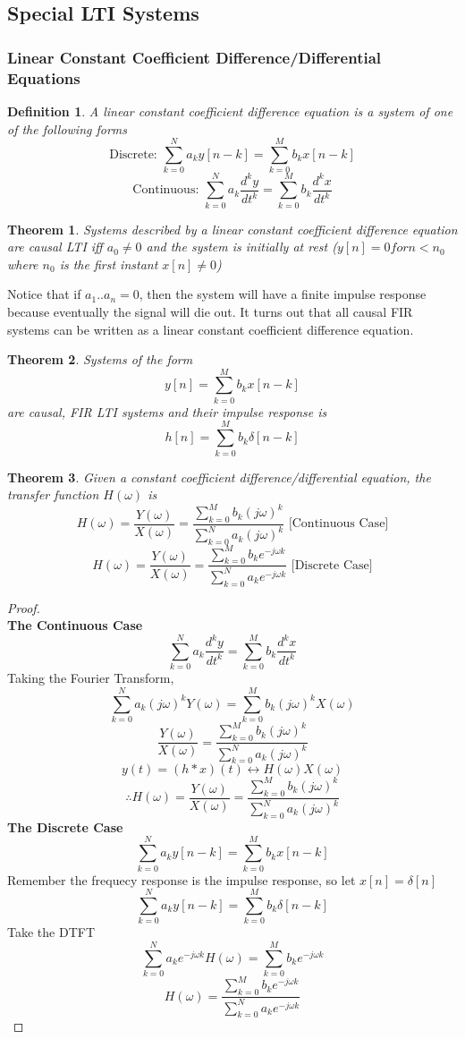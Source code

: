 \documentclass{article}
\newtheorem{theorem}{Theorem}
\newtheorem{definition}{Definition}
\newtheorem{proof}{Proof}
\begin{document}
\subsection{Special LTI Systems}
\subsubsection{Linear Constant Coefficient Difference/Differential Equations}
\begin{definition}
    A linear constant coefficient difference equation is a system of one of the following forms
    $$\text{Discrete: } \sum_{k=0}^{N}{a_k y[n-k]} = \sum_{k=0}^{M}{b_k x[n-k]}$$
    $$\text{Continuous: } \sum_{k=0}^{N}{a_k\frac{d^ky}{dt^k}} = \sum_{k=0}^{M}{b_k\frac{d^kx}{dt^k}}$$
\end{definition}
\begin{theorem}
    Systems described by a linear constant coefficient difference equation are causal LTI iff $a_0 \ne 0$
    and the system is initially at rest ($y[n] = 0 for n < n_0$ where $n_0$ is the first instant $x[n] \ne 0$)
\end{theorem}
Notice that if $a_1..a_n = 0$, then the system will have a finite impulse response because eventually the signal will die out.
It turns out that all causal FIR systems can be written as a linear constant coefficient difference equation.
\begin{theorem}
    Systems of the form
    $$y[n] = \sum_{k=0}^{M}{b_k x[n-k]}$$ are causal, FIR LTI systems and their impulse response is
    $$h[n] = \sum_{k=0}^{M}{b_k \delta[n-k]}$$
\end{theorem}
\begin{theorem}
    Given a constant coefficient difference/differential equation, the transfer function $H(\omega)$ is
    $$H(\omega) = \frac{Y(\omega)}{X(\omega)} = \frac{\sum_{k=0}^{M}{b_k(j\omega)^k}}{\sum_{k=0}^{N}{a_k(j\omega)^k}}\text{ [Continuous Case]}$$
    $$H(\omega) = \frac{Y(\omega)}{X(\omega)} = \frac{\sum_{k=0}^{M}{b_ke^{-j\omega k}}}{\sum_{k=0}^{N}{a_ke^{-j\omega k}}}\text{ [Discrete Case]}$$
\end{theorem}
\begin{proof}
    \textbf{\\The Continuous Case}
    $$\sum_{k=0}^{N}{a_k\frac{d^ky}{dt^k}} = \sum_{k=0}^{M}{b_k\frac{d^kx}{dt^k}}$$
    Taking the Fourier Transform,
    $$\sum_{k=0}^{N}{a_k(j\omega)^k Y(\omega)} = \sum_{k=0}^{M}{b_k(j\omega)^k X(\omega)}$$
    $$\frac{Y(\omega)}{X(\omega)} = \frac{\sum_{k=0}^{M}{b_k(j\omega)^k}}{\sum_{k=0}^{N}{a_k(j\omega)^k}}$$
    $$y(t) = (h*x)(t) \leftrightarrow H(\omega)X(\omega)$$
    $$\therefore H(\omega) = \frac{Y(\omega)}{X(\omega)} = \frac{\sum_{k=0}^{M}{b_k(j\omega)^k}}{\sum_{k=0}^{N}{a_k(j\omega)^k}}$$
    \textbf{The Discrete Case}
    $$\sum_{k=0}^{N}{a_k y[n-k]} = \sum_{k=0}^{M}{b_k x[n-k]}$$
    Remember the frequecy response is the impulse response, so let $x[n] = \delta[n]$
    $$\sum_{k=0}^{N}{a_k y[n-k]} = \sum_{k=0}^{M}{b_k \delta[n-k]}$$
    Take the DTFT
    $$\sum_{k=0}^{N}{a_k e^{-j\omega k}H(\omega)} = \sum_{k=0}^{M}{b_k e^{-j\omega k}}$$
    $$H(\omega) = \frac{\sum_{k=0}^{M}{b_k e^{-j\omega k}}}{\sum_{k=0}^{N}{a_k e^{-j\omega k}}}$$
\end{proof}
\end{document}
